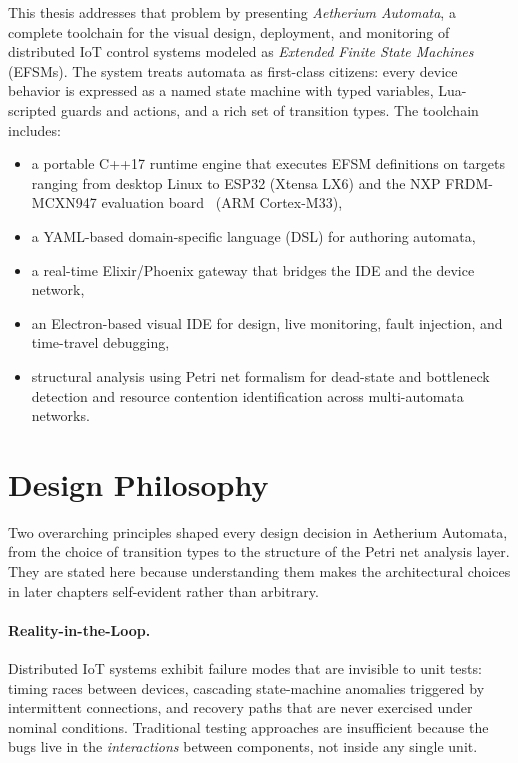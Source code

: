 This thesis addresses that problem by presenting \textit{Aetherium Automata}, a complete toolchain for the visual design, deployment, and monitoring of distributed IoT control systems modeled as \textit{Extended Finite State Machines} (EFSMs). The system treats automata as first-class citizens: every device behavior is expressed as a named state machine with typed variables, Lua-scripted guards and actions, and a rich set of transition types. The toolchain includes:

\begin{itemize}
  \item a portable C++17 runtime engine that executes EFSM definitions on targets ranging from desktop Linux to ESP32 (Xtensa LX6) and the NXP FRDM-MCXN947 evaluation board~\cite{NXPFRDMMCXN947} (ARM Cortex-M33),
  \item a YAML-based domain-specific language (DSL) for authoring automata,
  \item a real-time Elixir/Phoenix gateway that bridges the IDE and the device network,
  \item an Electron-based visual IDE for design, live monitoring, fault injection, and time-travel debugging,
  \item structural analysis using Petri net formalism for dead-state and bottleneck detection and resource contention identification across multi-automata networks.
\end{itemize}

\section{Design Philosophy}
\label{sec:philosophy}

Two overarching principles shaped every design decision in Aetherium Automata, from the choice of transition types to the structure of the Petri net analysis layer. They are stated here because understanding them makes the architectural choices in later chapters self-evident rather than arbitrary.

\paragraph{Reality-in-the-Loop.}
\label{par:ritl}
Distributed IoT systems exhibit failure modes that are invisible to unit tests: timing races between devices, cascading state-machine anomalies triggered by intermittent connections, and recovery paths that are never exercised under nominal conditions. Traditional testing approaches are insufficient because the bugs live in the \emph{interactions} between components, not inside any single unit.

